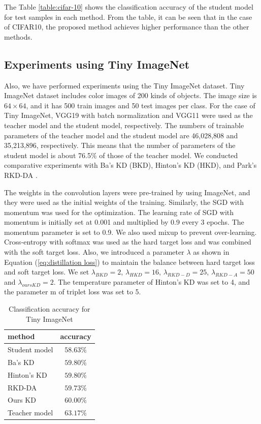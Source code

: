 \documentclass[conference]{IEEEtran}
\begin{document}
The Table \ref{table:cifar-10} shows the classification accuracy of the student model for test samples in each method.
From the table, it can be seen that in the case of CIFAR10, the proposed method achieves higher performance than the other methods.


\subsection{Experiments using Tiny ImageNet}

Also, we have performed experiments using the Tiny ImageNet dataset.
Tiny ImageNet dataset includes color images of 200 kinds of objects.
The image size is $64 \times 64$, and it has 500 train images and 50 test images per class.
For the case of Tiny ImageNet, VGG19 with batch normalization and VGG11 were used as the teacher model and the student model, respectively.
The numbers of trainable parameters of the teacher model and the student model are 46,028,808 and 35,213,896, respectively.
This means that the number of parameters of the student model is about 76.5$\%$ of those of the teacher model.
We conducted comparative experiments with Ba's KD \cite{Ba2014} (BKD), Hinton's KD \cite{Hinton2015} (HKD), and Park's RKD-DA \cite{Park2019}.


The weights in the convolution layers were pre-trained by using ImageNet, and they were used as the initial weights of the training.
Similarly, the SGD with momentum was used for the optimization.
The learning  rate  of  SGD  with momentum is initially set at 0.001 and multiplied by 0.9  every 3 epochs.  
The  momentum parameter  is  set  to  0.9. 
We also used mixup \cite{Zhang2017} to prevent over-learning.
 Cross-entropy with softmax was used as the hard target loss and was combined with the soft target loss.
Also, we introduced a parameter $\lambda$ as shown in Equation (\ref{eq:distillation loss}) to maintain the balance between hard target loss and soft target loss.
We set $\lambda_{BKD}=2$, $\lambda_{HKD}=16$, $\lambda_{RKD-D}=25$, $\lambda_{RKD-A}=50$ and $\lambda_{oursKD}=2$.
The temperature parameter of Hinton's KD \cite{Hinton2015} was set to 4, and the parameter m of triplet loss was set to 5.


\begin{table}[ht]
\caption{Classification accuracy for Tiny ImageNet}
\label{table:imagenet}
\begin{center}
\begin{tabular}{|l|c|}
\hline
method & accuracy \\ \hline \hline
Student model & $58.63\%$ \\ \hline
Ba's KD & $59.80\%$ \\ \hline
Hinton's KD & $59.80\%$ \\ \hline
RKD-DA & $59.73\%$     \\ \hline
Ours KD & $\bm{60.00}\%$ \\ \hline \hline
Teacher model  & $63.17\%$    \\
\hline
\end{tabular}
\end{center}
\end{table}
\end{document}
